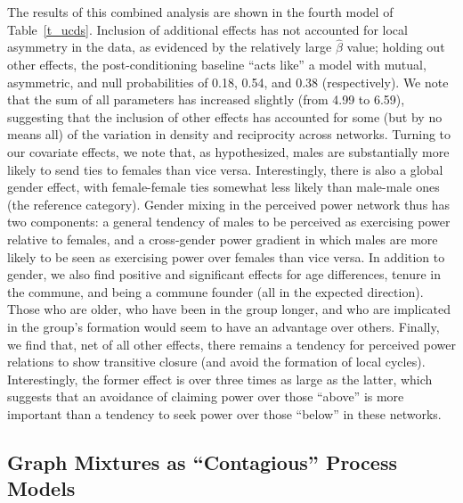 \documentclass[11pt]{article}
\begin{document}
The results of this combined analysis are shown in the fourth model of Table~\ref{t_ucds}.  Inclusion of additional effects has not accounted for local asymmetry in the data, as evidenced by the relatively large $\hat{\beta}$ value; holding out other effects, the post-conditioning baseline ``acts like'' a model with mutual, asymmetric, and null probabilities of 0.18, 0.54, and 0.38 (respectively).  We note that the sum of all parameters has increased slightly (from 4.99 to 6.59), suggesting that the inclusion of other effects has accounted for some (but by no means all) of the variation in density and reciprocity across networks.  Turning to our covariate effects, we note that, as hypothesized, males are substantially more likely to send ties to females than vice versa.  Interestingly, there is also a global gender effect, with female-female ties somewhat less likely than male-male ones (the reference category).  Gender mixing in the perceived power network thus has two components: a general tendency of males to be perceived as exercising power relative to females, and a cross-gender power gradient in which males are more likely to be seen as exercising power over females than vice versa.  In addition to gender, we also find positive and significant effects for age differences, tenure in the commune, and being a commune founder (all in the expected direction).  Those who are older, who have been in the group longer, and who are implicated in the group's formation would seem to have an advantage over others.  Finally, we find that, net of all other effects, there remains a tendency for perceived power relations to show transitive closure (and avoid the formation of local cycles).  Interestingly, the former effect is over three times as large as the latter, which suggests that an avoidance of claiming power over those ``above'' is more important than a tendency to seek power over those ``below'' in these networks.

\subsection{Graph Mixtures as ``Contagious'' Process Models} \label{sec_contagion}
\end{document}
